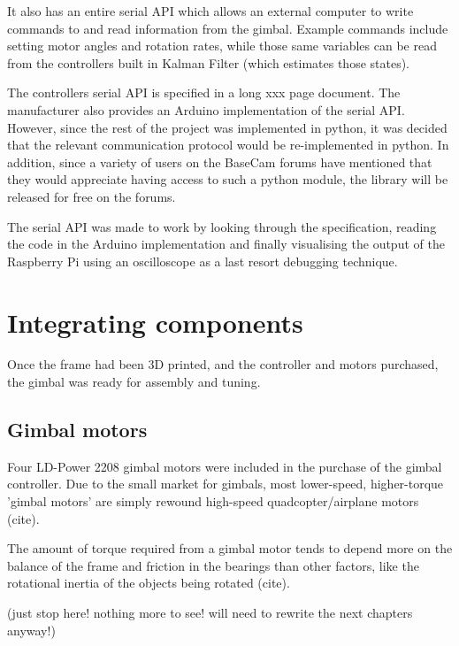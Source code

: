 
It also has an entire serial API which allows an external computer to write commands to and read information from the gimbal. Example commands include setting motor angles and rotation rates, while those same variables can be read from the controllers built in Kalman Filter (which estimates those states).

The controllers serial API is specified in a long {\color{red} xxx} page document. The manufacturer also provides an Arduino implementation of the serial API. However, since the rest of the project was implemented in python, it was decided that the relevant communication protocol would be re-implemented in python. In addition, since a variety of users on the BaseCam forums have mentioned that they would appreciate having access to such a python module, the library will be released for free on the forums.

The serial API was made to work by looking through the specification, reading the code in the Arduino implementation and finally visualising the output of the Raspberry Pi using an oscilloscope as a last resort debugging technique.


\section{Integrating components}
Once the frame had been 3D printed, and the controller and motors purchased, the gimbal was ready for assembly and tuning.

\subsection{Gimbal motors}
Four LD-Power 2208 gimbal motors were included in the purchase of the gimbal controller. Due to the small market for gimbals, most lower-speed, higher-torque 'gimbal motors' are simply rewound high-speed quadcopter/airplane motors {\color{red} (cite)}.

The amount of torque required from a gimbal motor tends to depend more on the balance of the frame and friction in the bearings than other factors, like the rotational inertia of the objects being rotated {\color{red} (cite)}.

{\Huge \color{red} (just stop here! nothing more to see! will need to rewrite the next chapters anyway!)}

